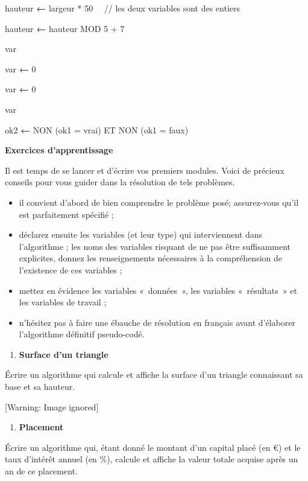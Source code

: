 {\sffamily
hauteur {\textbf{←}} largeur * 50 \ \ // les
deux variables sont des entiers}

{\sffamily
hauteur {\textbf{←}} hauteur MOD 5 + 7}


\bigskip

{\sffamily
{} var}

{\sffamily
var {\textbf{←}} 0}


\bigskip

{\sffamily
var {\textbf{←}} 0}

{\sffamily
{} var}


\bigskip

{\sffamily
ok2 {\textbf{←}} NON (ok1 = vrai) ET NON (ok1 =
faux)}

{\sffamily\bfseries\upshape
Exercices d’apprentissage}

{
Il est temps de se lancer et d'écrire vos premiers
modules. Voici de précieux conseils pour vous guider dans la résolution
de tels problèmes. }

\liststyleListv
\begin{itemize}
\item {
il convient d’abord de bien comprendre le problème posé; assurez-vous
qu’il est parfaitement spécifié ;}
\item {
déclarez ensuite les variables (et leur type) qui interviennent dans
l’algorithme ; les noms des variables risquant de ne pas être
suffisamment explicites, donnez les renseignements nécessaires à la
compréhension de l’existence de ces variables ;}
\item {
mettez en évidence les variables «~données~», les variables
«~résultats~» et les variables de travail ;}
\item {
n’hésitez pas à faire une ébauche de résolution en français avant
d’élaborer l’algorithme définitif pseudo-codé.}
\end{itemize}
\liststyleExercice
\begin{enumerate}
\item {\sffamily\bfseries
Surface d'un triangle}
\end{enumerate}
{
Écrire un algorithme qui calcule et affiche la surface
d'un triangle connaissant sa base et sa hauteur.}

\begin{center}
 [Warning: Image ignored] %

\end{center}
\liststyleExercice
\setcounter{saveenum}{\value{enumi}}
\begin{enumerate}
\setcounter{enumi}{\value{saveenum}}
\item {\sffamily\bfseries
Placement}
\end{enumerate}
{
Écrire un algorithme qui, étant donné le montant d’un capital placé (en
€) et le taux d’intérêt annuel (en \%), calcule et affiche la valeur
totale acquise après un an de ce placement.}


